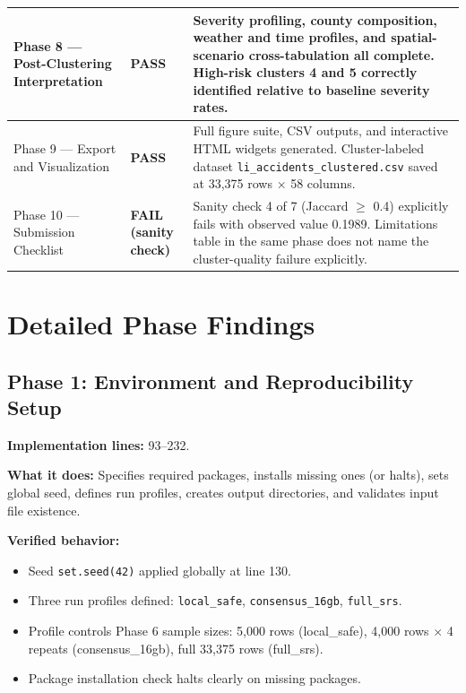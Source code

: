 \documentclass[11pt]{article}
\newcommand{\pass}{\textcolor{passgreen}{\textbf{PASS}}}
\newcommand{\sanfail}{\textcolor{failred}{\textbf{FAIL (sanity check)}}}
\begin{document}
\begin{longtable}{|p{3.2cm}|p{2cm}|p{8.5cm}|}
Phase 8 --- Post-Clustering Interpretation & \pass & Severity profiling,
county composition, weather and time profiles, and spatial-scenario
cross-tabulation all complete. High-risk clusters 4 and 5 correctly identified
relative to baseline severity rates. \\ \hline
Phase 9 --- Export and Visualization & \pass & Full figure suite, CSV outputs,
and interactive HTML widgets generated. Cluster-labeled dataset
\texttt{li\_accidents\_clustered.csv} saved at 33{,}375 rows $\times$ 58 columns. \\ \hline
Phase 10 --- Submission Checklist & \sanfail & Sanity check 4 of 7
(Jaccard $\geq$ 0.4) explicitly fails with observed value 0.1989. Limitations
table in the same phase does not name the cluster-quality failure explicitly. \\
\hline
\end{longtable}

\section{Detailed Phase Findings}

\subsection{Phase 1: Environment and Reproducibility Setup}

\textbf{Implementation lines:} 93--232.

\textbf{What it does:} Specifies required packages, installs missing ones (or halts),
sets global seed, defines run profiles, creates output directories, and validates
input file existence.

\textbf{Verified behavior:}
\begin{itemize}
\item Seed \texttt{set.seed(42)} applied globally at line 130.
\item Three run profiles defined: \texttt{local\_safe}, \texttt{consensus\_16gb},
  \texttt{full\_srs}.
\item Profile controls Phase 6 sample sizes: 5{,}000 rows (local\_safe),
  4{,}000 rows $\times$ 4 repeats (consensus\_16gb), full 33{,}375 rows
  (full\_srs).
\item Package installation check halts clearly on missing packages.
\end{itemize}
\end{document}
